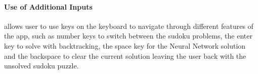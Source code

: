 \documentclass[]{final_report}
\begin{document}
\paragraph{Use of Additional Inputs}
allows user to use keys on the keyboard to navigate through different features of the app, such as number keys to switch between the sudoku problems, the enter key to solve with backtracking, the space key for the Neural Network solution and the backspace to clear the current solution leaving the user back with the unsolved sudoku puzzle.
\end{document}
